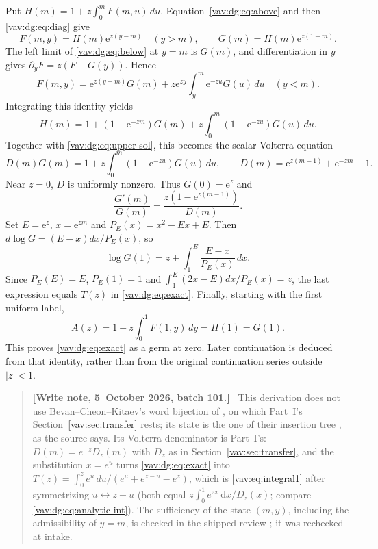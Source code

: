 \documentclass[11pt]{article}
\theoremstyle{remark}\newtheorem{remark}[theorem]{Remark}
\newcommand{\dd}{\,\mathrm d}
\newenvironment{writenoteb}{\begin{quote}\small\raggedright\textbf{[Write note, 5~October 2026, batch 101.]}\ }{\end{quote}}
\newcommand{\ee}{\mathrm e}
\begin{document}
Put $H(m)=1+z\int_0^mF(m,u)\,du$. Equation~\eqref{vav:dg:eq:above} and then
\eqref{vav:dg:eq:diag} give
\begin{equation}\label{vav:dg:eq:upper-sol}
 F(m,y)=H(m)\ee^{z(y-m)}\quad(y>m),\qquad
 G(m)=H(m)\ee^{z(1-m)}.
\end{equation}
The left limit of \eqref{vav:dg:eq:below} at $y=m$ is $G(m)$, and differentiation
in $y$ gives $\partial_yF=z(F-G(y))$. Hence
\begin{equation}\label{vav:dg:eq:lower-sol}
 F(m,y)=\ee^{z(y-m)}G(m)
           +z\ee^{zy}\int_y^m\ee^{-zu}G(u)\,du\quad(y<m).
\end{equation}
Integrating this identity yields
\[
 H(m)=1+(1-\ee^{-zm})G(m)
                     +z\int_0^m(1-\ee^{-zu})G(u)\,du.
\]
Together with \eqref{vav:dg:eq:upper-sol}, this becomes the scalar Volterra equation
\begin{equation}\label{vav:dg:eq:volterra}
 D(m)G(m)=1+z\int_0^m(1-\ee^{-zu})G(u)\,du,\qquad
 D(m)=\ee^{z(m-1)}+\ee^{-zm}-1.
\end{equation}
Near $z=0$, $D$ is uniformly nonzero. Thus $G(0)=\ee^z$ and
\[
 \frac{G'(m)}{G(m)}
  =\frac{z(1-\ee^{z(m-1)})}{D(m)}.
\]
Set $E=\ee^z$, $x=\ee^{zm}$ and $P_E(x)=x^2-Ex+E$.
Then $d\log G=(E-x)dx/P_E(x)$, so
\[
 \log G(1)=z+\int_1^E\frac{E-x}{P_E(x)}\,dx.
\]
Since $P_E(E)=E$, $P_E(1)=1$ and
$\int_1^E(2x-E)dx/P_E(x)=z$, the last expression equals $T(z)$ in
\eqref{vav:dg:eq:exact}. Finally, starting with the first uniform label,
\[
 A(z)=1+z\int_0^1F(1,y)\,dy=H(1)=G(1).
\]
This proves \eqref{vav:dg:eq:exact} as a germ at zero. Later continuation is
deduced from that identity, rather than from the original continuation
series outside $|z|<1$.
\begin{writenoteb}
This derivation does not use Bevan--Cheon--Kitaev's word bijection of
\cite[Proposition~7]{bck}, on which Part~I's Section~\ref{vav:sec:transfer}
rests; its state is the one of their insertion tree
\cite[Proposition~11]{bck}, as the source says. Its Volterra denominator is
Part~I's: $D(m)=e^{-z}D_z(m)$ with $D_z$ as in
Section~\ref{vav:sec:transfer}, and the substitution $x=e^{u}$ turns
\eqref{vav:dg:eq:exact} into $T(z)=\int_0^z e^u\,du/(e^u+e^{z-u}-e^z)$,
which is \eqref{vav:eq:integral1} after symmetrizing $u\leftrightarrow z-u$
(both equal $z\int_0^1 e^{zx}\dd x/D_z(x)$; compare
\eqref{vav:dg:eq:analytic-int}). The sufficiency of the state
$(m,y)$, including the admissibility of $y=m$, is checked in the shipped
review ; it was rechecked
at intake.
\end{writenoteb}
\end{document}
